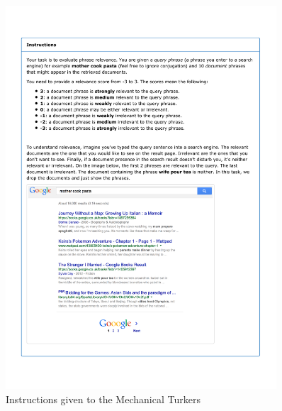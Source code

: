 \begin{figure}
\centering
\includegraphics[width=0.9\textwidth]{figures/instructions}

\caption{Instructions given to the Mechanical Turkers}

\label{fig:instructions}
\end{figure}


